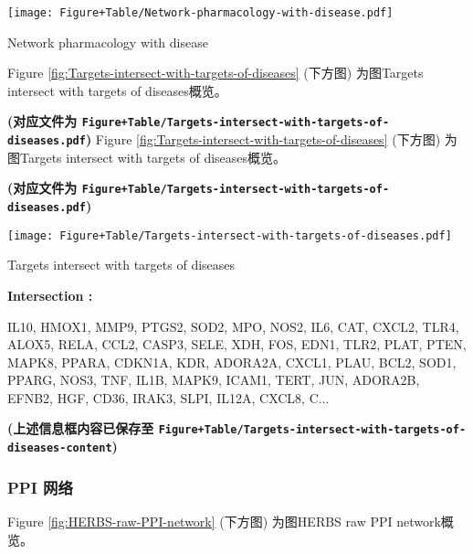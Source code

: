 \documentclass[
]{article}
\begin{document}
\def\@captype{figure}
\begin{center}
\texttt{[image: Figure+Table/Network-pharmacology-with-disease.pdf]}
\caption{Network pharmacology with disease}\label{fig:Network-pharmacology-with-disease}
\end{center}

Figure \ref{fig:Targets-intersect-with-targets-of-diseases} (下方图) 为图Targets intersect with targets of diseases概览。

\textbf{(对应文件为 \texttt{Figure+Table/Targets-intersect-with-targets-of-diseases.pdf})}
Figure \ref{fig:Targets-intersect-with-targets-of-diseases} (下方图) 为图Targets intersect with targets of diseases概览。

\textbf{(对应文件为 \texttt{Figure+Table/Targets-intersect-with-targets-of-diseases.pdf})}

\def\@captype{figure}
\begin{center}
\texttt{[image: Figure+Table/Targets-intersect-with-targets-of-diseases.pdf]}
\caption{Targets intersect with targets of diseases}\label{fig:Targets-intersect-with-targets-of-diseases}
\end{center}
\begin{center}\begin{tcolorbox}[colback=gray!10, colframe=gray!50, width=0.9\linewidth, arc=1mm, boxrule=0.5pt]
\textbf{
Intersection
:}

\vspace{0.5em}

    IL10, HMOX1, MMP9, PTGS2, SOD2, MPO, NOS2, IL6, CAT,
CXCL2, TLR4, ALOX5, RELA, CCL2, CASP3, SELE, XDH, FOS,
EDN1, TLR2, PLAT, PTEN, MAPK8, PPARA, CDKN1A, KDR, ADORA2A,
CXCL1, PLAU, BCL2, SOD1, PPARG, NOS3, TNF, IL1B, MAPK9,
ICAM1, TERT, JUN, ADORA2B, EFNB2, HGF, CD36, IRAK3, SLPI,
IL12A, CXCL8, C...

\vspace{2em}
\end{tcolorbox}
\end{center}

\textbf{(上述信息框内容已保存至 \texttt{Figure+Table/Targets-intersect-with-targets-of-diseases-content})}

\hypertarget{ppi-ux7f51ux7edc}{%
\subsubsection{PPI 网络}\label{ppi-ux7f51ux7edc}}

Figure \ref{fig:HERBS-raw-PPI-network} (下方图) 为图HERBS raw PPI network概览。
\end{document}
